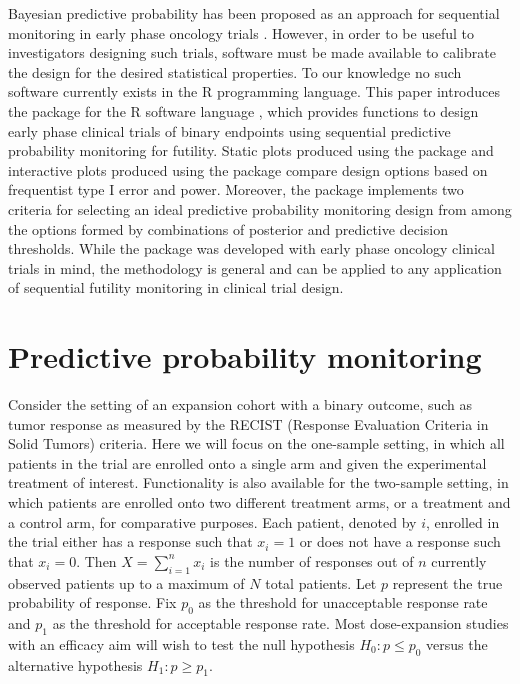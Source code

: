 Bayesian predictive probability has been proposed as an approach for
sequential monitoring in early phase oncology trials
\citep{Dmitrienko2006, Lee2008, Hobbs2018, Saville2014}. However, in
order to be useful to investigators designing such trials, software must
be made available to calibrate the design for the desired statistical
properties. To our knowledge no such software currently exists in the R
programming language. This paper introduces the  package
for the R software language \citep{RCT2020}, which provides functions to
design early phase clinical trials of binary endpoints using sequential
predictive probability monitoring for futility. Static plots produced
using the  package \citep{Wickham2016} and interactive
plots produced using the  package \citep{Sievert2020}
compare design options based on frequentist type I error and power.
Moreover, the  package implements two criteria for
selecting an ideal predictive probability monitoring design from among
the options formed by combinations of posterior and predictive decision
thresholds. While the  package was developed with early
phase oncology clinical trials in mind, the methodology is general and
can be applied to any application of sequential futility monitoring in
clinical trial design.

\hypertarget{predictive-probability-monitoring}{%
\section{Predictive probability
monitoring}\label{predictive-probability-monitoring}}

Consider the setting of an expansion cohort with a binary outcome, such
as tumor response as measured by the RECIST (Response Evaluation
Criteria in Solid Tumors) criteria. Here we will focus on the one-sample
setting, in which all patients in the trial are enrolled onto a single
arm and given the experimental treatment of interest. Functionality is
also available for the two-sample setting, in which patients are
enrolled onto two different treatment arms, or a treatment and a control
arm, for comparative purposes. Each patient, denoted by \(i\), enrolled
in the trial either has a response such that \(x_i = 1\) or does not
have a response such that \(x_i = 0\). Then \(X = \sum_{i=1}^n x_i\) is
the number of responses out of \(n\) currently observed patients up to a
maximum of \(N\) total patients. Let \(p\) represent the true
probability of response. Fix \(p_0\) as the threshold for unacceptable
response rate and \(p_1\) as the threshold for acceptable response rate.
Most dose-expansion studies with an efficacy aim will wish to test the
null hypothesis \(H_0: p \leq p_0\) versus the alternative hypothesis
\(H_1: p \geq p_1\).

